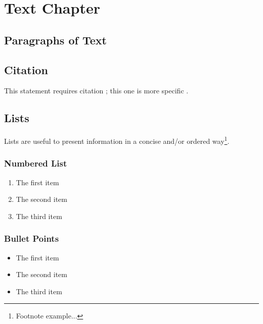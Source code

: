 \documentclass[11pt,fleqn]{book} %
\begin{document}

\chapter{Text Chapter}

\section{Paragraphs of Text}

\lipsum[1-7] %


\section{Citation}

This statement requires citation \cite{book_key}; this one is more specific \cite[122]{article_key}.


\section{Lists}

Lists are useful to present information in a concise and/or ordered way\footnote{Footnote example...}.

\subsection{Numbered List}

\begin{enumerate}
\item The first item
\item The second item
\item The third item
\end{enumerate}

\subsection{Bullet Points}

\begin{itemize}
\item The first item
\item The second item
\item The third item
\end{itemize}
\end{document}
